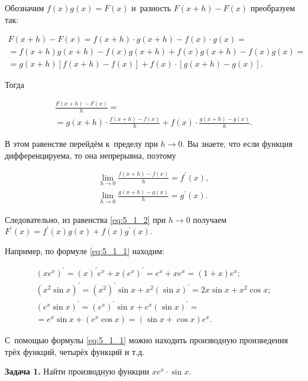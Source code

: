 Обозначим $f(x)g(x) = F(x)$ и~разность $F(x+h)- F(x)$ преобразуем так:

\begin{multline*}
F(x+h) - F(x) = f(x+h) \cdot g(x+h) - f(x) \cdot g(x) = \\
= f(x+h) g(x+h) - f(x) g(x+h) + f(x) g(x+h) - f(x) g(x) = \\
= g(x+h)[f(x+h) - f(x)] + f(x)\cdot [g(x+h) - g(x)].
\end{multline*}

\noindent
Тогда

\begin{multline}\label{eq:5_1_2}
\displaystyle \frac{F(x+h) - F(x)}{h} = \\
= g(x+h) \cdot \frac{f(x+h) - f(x)}{h} + f(x) \cdot \frac{g(x+h) - g(x)}{h}.
\end{multline}

В этом равенстве перейдём к~пределу при $h \to 0$.
Вы знаете, что если функция дифференцируема, то она непрерывна,
поэтому

\begin{gather*}
\displaystyle \lim_{h \to 0} \frac{f(x+h) - f(x)}{h} = f^\prime(x), \\
\displaystyle \lim_{h \to 0} \frac{g(x+h) - g(x)}{h} = g^\prime(x). 
\end{gather*}

Следовательно, из равенства \eqref{eq:5_1_2} при $h \to 0$ получаем
$F^\prime (x) = f^\prime(x)g(x) + f(x)g^\prime(x)$.

Например, по формуле \eqref{eq:5_1_1} находим:

\begin{gather*}
\left( xe^{x} \right)^\prime =
    (x)^\prime e^{x} + x(e^{x})^\prime = e^{x} + xe^{x} = (1+x)e^{x}; \\
\left( x^{2} \sin x \right)^\prime = 
    \left( x^{2} \right)^\prime \sin x + x^{2}(\sin x)^\prime = 2x \sin x + x^{2} \cos x; \\
\left( e^{x} \sin x \right)^\prime =
    \left( e^{x} \right)^\prime \sin x + e^{x} (\sin x)^\prime = \\
    = e^{x} \sin x + \left( e^{x} \cos x \right) = (\sin x + \cos x) e^{x}.
\end{gather*}

С~помощью формулы \eqref{eq:5_1_1} можно находить производную произведения трёх функций,
четырёх функций и т.д.

\textbf{Задача 1.}\label{ex:5_1_1} Найти производную функции $xe^{x} \cdot \sin x$.

